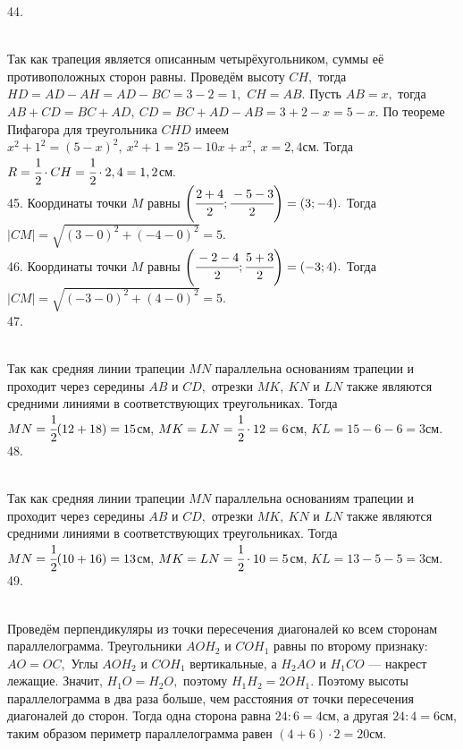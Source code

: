 44. \begin{figure}[ht!]
\end{figure}\\
Так как трапеция является описанным четырёхугольником, суммы её противоположных сторон равны. Проведём высоту $CH,$ тогда $HD=AD-AH=AD-BC=3-2=1,$ $CH=AB.$ Пусть $AB=x,$ тогда $AB+CD=BC+AD,\ CD=BC+AD-AB=3+2-x=5-x.$ По теореме Пифагора для треугольника $CHD$ имеем $x^2+1^2=(5-x)^2,\ x^2+1=25-10x+x^2,\ x=2,4$см. Тогда $R=\cfrac{1}{2}\cdot CH=\cfrac{1}{2}\cdot 2,4=1,2$см.\\
45. Координаты точки $M$ равны $\left(\cfrac{2+4}{2};\cfrac{-5-3}{2}\right)=(3;-4).$ Тогда $|CM|=\sqrt{(3-0)^2+(-4-0)^2}=5.$\\
46. Координаты точки $M$ равны $\left(\cfrac{-2-4}{2};\cfrac{5+3}{2}\right)=(-3;4).$ Тогда $|CM|=\sqrt{(-3-0)^2+(4-0)^2}=5.$\\
47. \begin{figure}[ht!]
\end{figure}\\
Так как средняя линии трапеции $MN$ параллельна основаниям трапеции и проходит через середины $AB$ и $CD,$ отрезки $MK,\ KN$ и $LN$ также являются средними линиями в соответствующих треугольниках. Тогда $MN=\cfrac{1}{2}(12+18)=15$см, $MK=LN=\cfrac{1}{2}\cdot12=6$см, $KL=15-6-6=3$см.\\
48. \begin{figure}[ht!]
\end{figure}\\
Так как средняя линии трапеции $MN$ параллельна основаниям трапеции и проходит через середины $AB$ и $CD,$ отрезки $MK,\ KN$ и $LN$ также являются средними линиями в соответствующих треугольниках. Тогда $MN=\cfrac{1}{2}(10+16)=13$см, $MK=LN=\cfrac{1}{2}\cdot10=5$см, $KL=13-5-5=3$см.\\
49. \begin{figure}[ht!]
\end{figure}\\
Проведём перпендикуляры из точки пересечения диагоналей ко всем сторонам параллелограмма. Треугольники $AOH_2$ и $COH_1$ равны по второму признаку: $AO=OC,$ Углы $AOH_2$ и $COH_1$ вертикальные, а $H_2AO$ и $H_1CO$ --- накрест лежащие. Значит, $H_1O=H_2O,$ поэтому $H_1H_2=2OH_1.$ Поэтому высоты параллелограмма в два раза больше, чем расстояния от точки пересечения диагоналей до сторон. Тогда одна сторона равна $24:6=4$см, а другая $24:4=6$см, таким образом периметр параллелограмма равен $(4+6)\cdot2=20$см.\\
